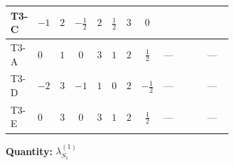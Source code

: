 \documentclass[8pt]{article}
\begin{document}
\begin{landscape}
\begin{longtable}{@{}llcccccc >{\raggedright\arraybackslash}p{0.21\linewidth} >{\raggedright\arraybackslash}p{0.21\linewidth} >{\raggedright\arraybackslash}p{0.21\linewidth}@{}}
\midrule
T3-C & $-1$ & $2$ & $-\frac{1}{2}$ & $2$ & $\frac{1}{2}$ & $3$ & $0$ & \scriptsize\adjustbox{max width=\linewidth}{$\begin{gathered} +\frac{3 {g_1}^4}{4}\end{gathered}$} & \scriptsize\adjustbox{max width=\linewidth}{$\begin{gathered} +4 {\lambda_{12}^{(1)}}^2\end{gathered}$} & \scriptsize\adjustbox{max width=\linewidth}{$\begin{gathered} +\frac{{\lambda_{12}^{(A)}}^2}{4}\end{gathered}$} \\
\midrule
T3-A & $0$ & $1$ & $0$ & $3$ & $1$ & $2$ & $\frac{1}{2}$ & --- & \scriptsize\adjustbox{max width=\linewidth}{$\begin{gathered} +6 {\lambda_{12}^{(1)}}^2\end{gathered}$} & --- \\
\midrule
T3-D & $-2$ & $3$ & $-1$ & $1$ & $0$ & $2$ & $-\frac{1}{2}$ & --- & \scriptsize\adjustbox{max width=\linewidth}{$\begin{gathered} +2 {\lambda_{12}^{(1)}}^2\end{gathered}$} & --- \\
\midrule
T3-E & $0$ & $3$ & $0$ & $3$ & $1$ & $2$ & $\frac{1}{2}$ & --- & \scriptsize\adjustbox{max width=\linewidth}{$\begin{gathered} +6 {\lambda_{12}^{(1)}}^2\end{gathered}$} & --- \\
\midrule
\bottomrule
\end{longtable}
\clearpage
\noindent\textbf{Quantity: }$\lambda_{S_1}^{(1)}$\par\smallskip

\end{landscape}
\end{document}
